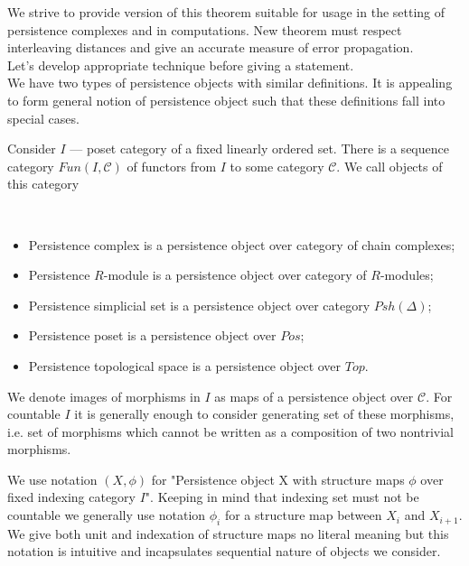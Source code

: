 We strive to provide version of this theorem suitable for usage in the setting of persistence complexes and in computations. New theorem must respect interleaving distances and give an accurate measure of error propagation.\\
Let's develop appropriate technique before giving a statement.\\

We have two types of persistence objects with similar definitions. It is appealing to form general notion of persistence object such that these definitions fall into special cases.\\

\begin{definition}
  Consider $I$ --- poset category of a fixed linearly ordered set. There is a sequence category $Fun(I, \mathcal{C})$ of functors from $I$ to some category $\mathcal{C}$. We call objects of this category 
\end{definition}

\begin{example} ~ \par
  \begin{itemize}
    \item Persistence complex is a persistence object over category of chain complexes;
    \item Persistence $R$-module is a persistence object over category of $R$-modules;
    \item Persistence simplicial set is a persistence object over category $Psh(\Delta)$;
    \item Persistence poset is a persistence object over $Pos$;
    \item Persistence topological space is a persistence object over $Top$.
  \end{itemize}
\end{example}

\begin{definition}
  We denote images of morphisms in $I$ as  maps of a persistence object over $\mathcal{C}$. For countable $I$ it is generally enough to consider generating set of these morphisms, i.e. set of morphisms which cannot be written as a composition of two nontrivial morphisms.
\end{definition}

We use notation $(X,\phi)$ for "Persistence object X with structure maps $\phi$ over fixed indexing category $I$". Keeping in mind that indexing set must not be countable we generally use notation $\phi_i$ for a structure map between $X_i$ and $X_{i+1}$. We give both unit and indexation of structure maps no literal meaning but this notation is intuitive and incapsulates sequential nature of objects we consider.\\

